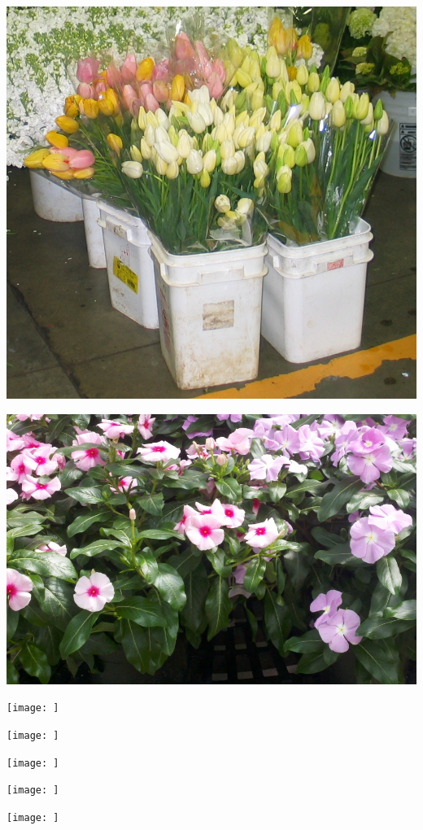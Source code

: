 \documentclass{article}
\begin{document}
\begin{center}
\includegraphics[height=0.925\paperheight]{../Tulips.jpg}
\end{center}
\newpage

\begin{center}
\includegraphics[height=0.925\paperheight]{../Vinca.jpg}
\end{center}
\newpage

\begin{center}
\texttt{[image:  ]}
\end{center}
\newpage

\begin{center}
\texttt{[image:  ]}
\end{center}
\newpage

\begin{center}
\texttt{[image:  ]}
\end{center}
\newpage

\begin{center}
\texttt{[image:  ]}
\end{center}
\newpage

\begin{center}
\texttt{[image:  ]}
\end{center}
\newpage
\end{document}
